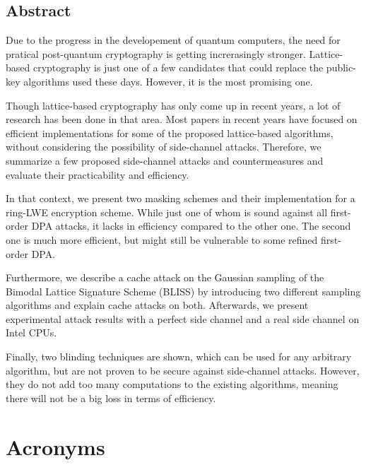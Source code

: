 \documentclass[a4paper,12pt,twoside,openany,headsepline,bibliography=totocnumbered]{scrbook}
\begin{document}


\section*{Abstract}
Due to the progress in the developement of quantum computers, the need for pratical post-quantum cryptography is getting increrasingly stronger. Lattice-based cryptography is just one of a few candidates that could replace the public-key algorithms used these days. However, it is the most promising one.

Though lattice-based cryptography has only come up in recent years, a lot of research has been done in that area. Most papers in recent years have focused on efficient implementations for some of the proposed lattice-based algorithms, without considering the possibility of side-channel attacks. Therefore, we summarize a few proposed side-channel attacks and  countermeasures and evaluate their practicability and efficiency.

In that context, we present two masking schemes and their implementation for a ring-LWE encryption scheme. While just one of whom is sound against all first-order DPA attacks, it lacks in efficiency compared to the other one. The second one is much more efficient, but might still be vulnerable to some refined first-order DPA.

Furthermore, we describe a cache attack on the Gaussian sampling of the Bimodal Lattice Signature Scheme (BLISS) by introducing two different sampling algorithms and explain cache attacks on both. Afterwards, we present experimental attack results with a perfect side channel and a real side channel on Intel CPUs.

Finally, two blinding techniques are shown, which can be used for any arbitrary algorithm, but are not proven to be secure against side-channel attacks. However, they do not add too many computations to the existing algorithms, meaning there will not be a big loss in terms of efficiency.
\clearpage

\tableofcontents
\mainmatter

\chapter*{Acronyms}
\begin{acronym}
 	\setlength{\itemsep}{0.2em} 
\end{acronym}
\end{document}
